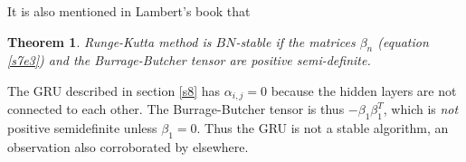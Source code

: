 \documentclass{article}
\numberwithin{equation}{section}
\newtheorem{thm}{Theorem}
\begin{document}
It is also mentioned in Lambert's book \cite{lambert1991numerical} that
\begin{thm}\label{s9t1}
Runge-Kutta method is $BN$-stable if the matrices $\beta_n$ (equation
\eqref{s7e3}) and the Burrage-Butcher tensor are positive semi-definite.
\end{thm}

The GRU described in section \ref{s8} has $\alpha_{i, j} = 0$ because the
hidden layers are not connected to each other. The Burrage-Butcher tensor 
is thus $-\beta_1 \beta_1^T$, which is \emph{not} positive semidefinite 
unless $\beta_1 = 0$.  Thus the GRU is not a stable algorithm, an 
observation also corroborated by elsewhere\cite{kanai2017preventing}.


\end{document}
